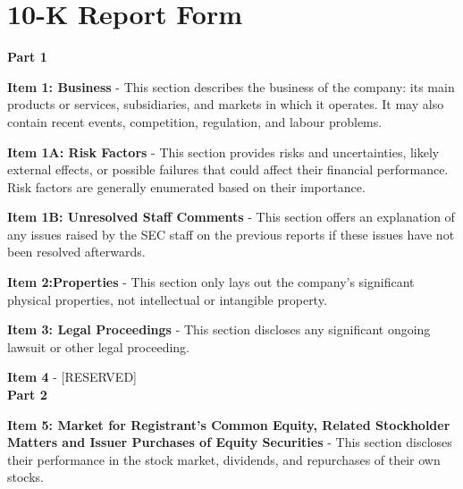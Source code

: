 \documentclass[logo,bsc,singlespacing,parskip]{infthesis}
\begin{document}


% 
% 



\appendix

\chapter{10-K Report Form}

\label{appendix_10-k}

\textbf{Part 1}

\textbf{Item 1: Business} - This section describes the business of the company: its main products or services, subsidiaries, and markets in which it operates. It may also contain recent events, competition, regulation, and labour problems. 

\textbf{Item 1A: Risk Factors} - This section provides risks and uncertainties, likely external effects, or possible failures that could affect their financial performance. Risk factors are generally enumerated based on their importance. 

\textbf{Item 1B: Unresolved Staff Comments} - This section offers an explanation of any issues raised by the SEC staff on the previous reports if these issues have not been resolved afterwards.

\textbf{Item 2:Properties} - This section only lays out the company’s significant physical properties, not intellectual or intangible property.

\textbf{Item 3: Legal Proceedings} - This section discloses any significant ongoing lawsuit or other legal proceeding. 

\textbf{Item 4} - [RESERVED] \\


\textbf{Part 2} 


\textbf{Item 5: Market for Registrant’s Common Equity, Related Stockholder Matters and Issuer Purchases of Equity Securities} - This section discloses their performance in the stock market, dividends, and repurchases of their own stocks. 
\end{document}
